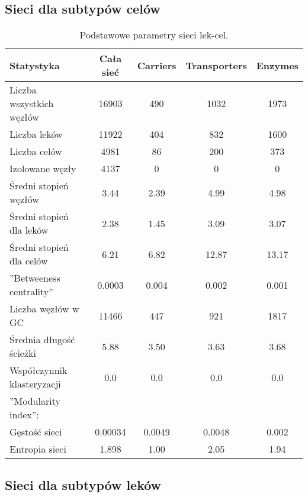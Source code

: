 \documentclass[11pt]{article}
\begin{document}
\subsection{Sieci dla subtypów celów}

\begin{table}[h!]
\begin{center}
\caption{Podstawowe parametry sieci lek-cel.}
\label{t:stats_target}
\begin{tabular}{l|c|c|c|c}

	Statystyka & Cała sieć & Carriers & Transporters & Enzymes\\
	\hline
	Liczba wszystkich węzłów & 16903 & 490 & 1032 & 1973\\
	Liczba leków & 11922 & 404 & 832 & 1600\\
	Liczba celów & 4981 & 86 & 200 & 373\\
	Izolowane węzły & 4137 & 0 & 0 & 0\\
	Średni stopień węzłów & 3.44 & 2.39 & 4.99 & 4.98\\
	Średni stopień dla leków & 2.38 & 1.45 & 3.09 & 3.07\\
	Średni stopień dla celów & 6.21 & 6.82 & 12.87 & 13.17\\
	''Betweeness centrality'' & 0.0003 & 0.004 & 0.002 & 0.001\\
	Liczba węzłów w GC & 11466 & 447 & 921 & 1817\\
	Średnia długość ścieżki & 5.88 & 3.50 & 3.63 & 3.68\\
	Współczynnik klasteryzacji & 0.0 & 0.0 & 0.0 & 0.0\\
	''Modularity index'': & \\
	Gęstość sieci & 0.00034 & 0.0049 & 0.0048 & 0.002\\
	Entropia sieci & 1.898 & 1.00 & 2.05 & 1.94\\

\end{tabular}
\end{center}
\end{table}

\subsection{Sieci dla subtypów leków}
\end{document}
